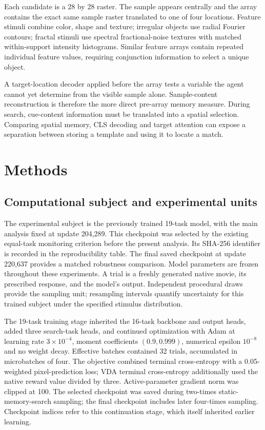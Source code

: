 \documentclass[11pt]{article}
\begin{document}
Each candidate is a 28 by 28 raster. The sample appears centrally and the array contains the exact same sample raster translated to one of four locations. Feature stimuli combine color, shape and texture; irregular objects use radial Fourier contours; fractal stimuli use spectral fractional-noise textures with matched within-support intensity histograms. Similar feature arrays contain repeated individual feature values, requiring conjunction information to select a unique object.

A target-location decoder applied before the array tests a variable the agent cannot yet determine from the visible sample alone. Sample-content reconstruction is therefore the more direct pre-array memory measure. During search, cue-content information must be translated into a spatial selection. Comparing spatial memory, CLS decoding and target attention can expose a separation between storing a template and using it to locate a match.


\section{Methods}
\subsection{Computational subject and experimental units}
The experimental subject is the previously trained 19-task model, with the main analysis fixed at update 204,289. This checkpoint was selected by the existing equal-task monitoring criterion before the present analysis. Its SHA-256 identifier is recorded in the reproducibility table. The final saved checkpoint at update 220,637 provides a matched robustness comparison. Model parameters are frozen throughout these experiments. A trial is a freshly generated native movie, its prescribed response, and the model's output. Independent procedural draws provide the sampling unit; resampling intervals quantify uncertainty for this trained subject under the specified stimulus distribution.

The 19-task training stage inherited the 16-task backbone and output heads, added three search-task heads, and continued optimization with Adam at learning rate $3\times10^{-4}$, moment coefficients $(0.9,0.999)$, numerical epsilon $10^{-8}$ and no weight decay. Effective batches contained 32 trials, accumulated in microbatches of four. The objective combined terminal cross-entropy with a 0.05-weighted pixel-prediction loss; VDA terminal cross-entropy additionally used the native reward value divided by three. Active-parameter gradient norm was clipped at 100. The selected checkpoint was saved during two-times static-memory-search sampling; the final checkpoint includes later four-times sampling. Checkpoint indices refer to this continuation stage, which itself inherited earlier learning.
\end{document}
